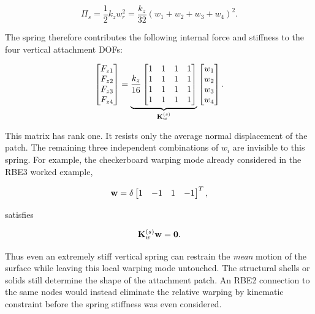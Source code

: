 \begin{equation}
    \Pi_s
    =\frac{1}{2}k_z w_r^2
    =\frac{k_z}{32}(w_1+w_2+w_3+w_4)^2.
\end{equation}

The spring therefore contributes the following internal force and stiffness to
the four vertical attachment DOFs:

\begin{equation}\label{rbe3-example-vertical-spring-matrix}
    \begin{bmatrix}
    F_{z1}\\F_{z2}\\F_{z3}\\F_{z4}
    \end{bmatrix}
    =
    \underbrace{\frac{k_z}{16}
    \begin{bmatrix}
    1&1&1&1\\
    1&1&1&1\\
    1&1&1&1\\
    1&1&1&1
    \end{bmatrix}}_{\mathbf{K}_{w}^{(s)}}
    \begin{bmatrix}
    w_1\\w_2\\w_3\\w_4
    \end{bmatrix}.
\end{equation}

This matrix has rank one. It resists only the average normal displacement of the
patch. The remaining three independent combinations of $w_i$ are invisible to
this spring. For example, the checkerboard warping mode already considered in
the RBE3 worked example,

\begin{equation}
    \mathbf{w}=\delta\begin{bmatrix}1&-1&1&-1\end{bmatrix}^{T},
\end{equation}

satisfies

\begin{equation}
    \mathbf{K}_{w}^{(s)}\mathbf{w}=\mathbf{0}.
\end{equation}

Thus even an extremely stiff vertical spring can restrain the \emph{mean} motion
of the surface while leaving this local warping mode untouched. The structural
shells or solids still determine the shape of the attachment patch. An RBE2
connection to the same nodes would instead eliminate the relative warping by
kinematic constraint before the spring stiffness was even considered.

